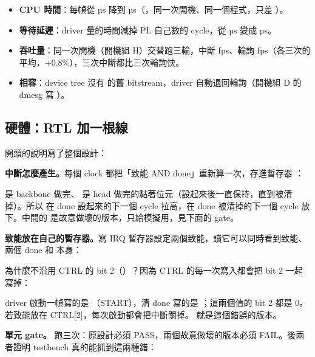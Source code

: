 \begin{gain}
\begin{itemize}
\item \textbf{CPU 時間}：每幀從 \pollCpuUs{} µs 降到 \irqCpuUs{} µs（，同一次開機、同一個程式，只差 ）。
\item \textbf{等待延遲}：driver 量的時間減掉 PL 自己數的 cycle，從 \pollWaitUs{} µs 變成 \irqWaitUs{} µs。
\item \textbf{吞吐量}：同一次開機（開機組 H）交替跑三輪，中斷 \hIrqFps{} fps、輪詢 \hPollFps{} fps（各三次的平均，+0.8\%），三次中斷都比三次輪詢快。
\item \textbf{相容}：device tree 沒有  的舊 bitstream，driver 自動退回輪詢（開機組 D 的 dmesg 寫 ）。
\end{itemize}
\end{gain}

\subsection{硬體：RTL 加一根線}

 開頭的說明寫了整個設計：


\textbf{中斷怎麼產生。}每個 clock 都把「致能 AND done」重新算一次，存進暫存器 ：


 是 backbone 做完、 是 head 做完的黏著位元（設起來後一直保持，直到被清掉）。所以  在 done 設起來的下一個 cycle 拉高，在 done 被清掉的下一個 cycle 放下。中間的  是故意做壞的版本，只給模擬用，見下面的 gate。

\textbf{致能放在自己的暫存器。}寫 IRQ 暫存器設定兩個致能，讀它可以同時看到致能、兩個 done 和  本身：


為什麼不沿用 CTRL 的 bit 2（）？因為 CTRL 的每一次寫入都會把 bit 2 一起寫掉：


driver 啟動一幀寫的是 （START），清 done 寫的是 ；這兩個值的 bit 2 都是 0。若致能放在 CTRL[2]，每次啟動都會把中斷關掉。 就是這個錯誤的版本。

\textbf{單元 gate。} 跑三次：原設計必須 PASS，兩個故意做壞的版本必須 FAIL。後兩者證明 testbench 真的能抓到這兩種錯：

